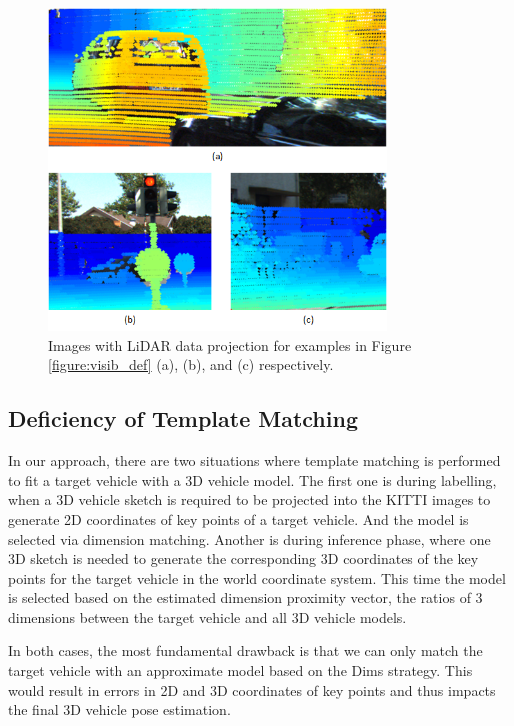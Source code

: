 \documentclass[a4paper,12pt]{article}
\begin{document}
\begin{figure}[H]		
	\includegraphics[width=0.8\textwidth]{visib_def_lidar.png}
	\caption[LiDAR data projection]{Images with LiDAR data projection for examples in Figure \ref{figure:visib_def} (a), (b), and (c) respectively.}
	\centering
	\label{figure:visib_def_lidar}
\end{figure}

\subsection{Deficiency of Template Matching}
In our approach, there are two situations where template matching is performed to fit a target vehicle with a 3D vehicle model. The first one is during labelling, when a 3D vehicle sketch is required to be projected into the KITTI images to generate 2D coordinates of key points of a target vehicle. And the model is selected via dimension matching. Another is during inference phase, where one 3D sketch is needed to generate the corresponding 3D coordinates of the key points for the target vehicle in the world coordinate system. This time the model is selected based on the estimated dimension proximity vector, \ie the ratios of 3 dimensions between the target vehicle and all 3D vehicle models.

In both cases, the most fundamental drawback is that we can only match the target vehicle with an approximate model based on the Dims strategy. This would result in errors in 2D and 3D coordinates of key points and thus impacts the final 3D vehicle pose estimation.
\end{document}
